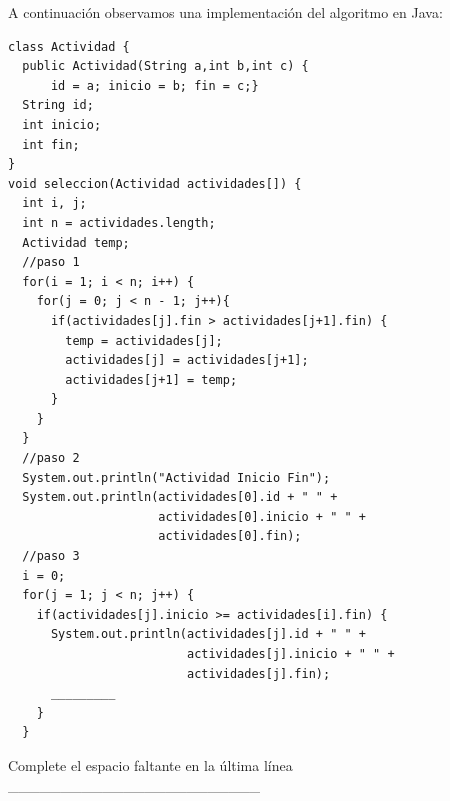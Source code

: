 \documentclass[twocolumn]{article}
\begin{document}
A continuación observamos una implementación del algoritmo en Java:

{\small
\begin{verbatim}
class Actividad {
  public Actividad(String a,int b,int c) {
      id = a; inicio = b; fin = c;}
  String id;
  int inicio;
  int fin;
}
void seleccion(Actividad actividades[]) {
  int i, j;
  int n = actividades.length;
  Actividad temp;
  //paso 1
  for(i = 1; i < n; i++) {
    for(j = 0; j < n - 1; j++){
      if(actividades[j].fin > actividades[j+1].fin) {
        temp = actividades[j];
        actividades[j] = actividades[j+1];
        actividades[j+1] = temp;
      }
    }
  }
  //paso 2
  System.out.println("Actividad Inicio Fin");
  System.out.println(actividades[0].id + " " + 
                     actividades[0].inicio + " " +  
                     actividades[0].fin);
  //paso 3
  i = 0;
  for(j = 1; j < n; j++) {
    if(actividades[j].inicio >= actividades[i].fin) {
      System.out.println(actividades[j].id + " " +  
                         actividades[j].inicio + " " +  
                         actividades[j].fin);
      _________
    }
  }

\end{verbatim}
}

Complete el espacio faltante en la última línea \\

	\_\_\_\_\_\_\_\_\_\_\_\_\_\_\_\_\_\_\_\_\_\_\_\_

\end{document}
